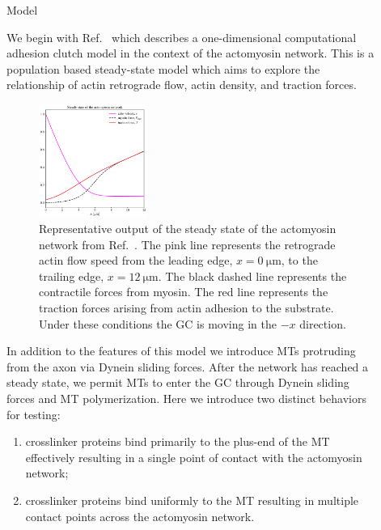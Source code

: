 \documentclass{beamer}
\newlength{\sepwidth}
\newlength{\colwidth}
\newcommand{\separatorcolumn}{\begin{column}{\sepwidth}\end{column}}
\begin{document}
\begin{frame}[t]
\begin{columns}[t]
\begin{column}{\colwidth}
\end{column}
\separatorcolumn%


\begin{column}{\colwidth}

\begin{block}{Model}

We begin with Ref.~\cite{craig2012bj} which describes a one-dimensional computational adhesion clutch model in the context of the actomyosin network. This is a population based steady-state model which aims to explore the relationship of actin retrograde flow, actin density, and traction forces.

\begin{figure}
    \centering
    \includegraphics[width=0.35\textwidth]{../.figures/steady_state_og.pdf}
    \caption{\label{fig:sim_steady}
        Representative output of the steady state of the actomyosin network from Ref.~\cite{craig2012bj}. The pink line represents the retrograde actin flow speed from the leading edge, \(x=\qty{0}{\micro\meter}\), to the trailing edge, \(x=\qty{12}{\micro\meter}\). The black dashed line represents the contractile forces from myosin. The red line represents the traction forces arising from actin adhesion to the substrate. Under these conditions the GC is moving in the \(-x\) direction.
    }
\end{figure}

In addition to the features of this model we introduce MTs protruding from the axon via Dynein sliding forces. After the network has reached a steady state, we permit MTs to enter the GC through Dynein sliding forces and MT polymerization. Here we introduce two distinct behaviors for testing:
\begin{enumerate}
\item crosslinker proteins bind primarily to the plus-end of the MT effectively resulting in a single point of contact with the actomyosin network;
\item crosslinker proteins bind uniformly to the MT resulting in multiple contact points across the actomyosin network.
\end{enumerate}


\end{block}
\end{column}
\end{columns}
\end{frame}
\end{document}
